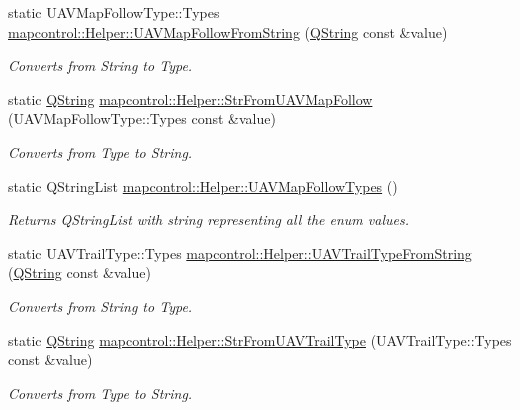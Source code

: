 \begin{DoxyCompactItemize}
static \-U\-A\-V\-Map\-Follow\-Type\-::\-Types \hyperlink{group___o_p_map_widget_ga7708397f9398bd6c207bd305ee711221}{mapcontrol\-::\-Helper\-::\-U\-A\-V\-Map\-Follow\-From\-String} (\hyperlink{group___u_a_v_objects_plugin_gab9d252f49c333c94a72f97ce3105a32d}{\-Q\-String} const \&value)
\begin{DoxyCompactList}\small\item\em \-Converts from \-String to \-Type. \end{DoxyCompactList}\item 
static \hyperlink{group___u_a_v_objects_plugin_gab9d252f49c333c94a72f97ce3105a32d}{\-Q\-String} \hyperlink{group___o_p_map_widget_ga94cca4ceda7e5cdea3ae019436aa0429}{mapcontrol\-::\-Helper\-::\-Str\-From\-U\-A\-V\-Map\-Follow} (\-U\-A\-V\-Map\-Follow\-Type\-::\-Types const \&value)
\begin{DoxyCompactList}\small\item\em \-Converts from \-Type to \-String. \end{DoxyCompactList}\item 
static \-Q\-String\-List \hyperlink{group___o_p_map_widget_gacb5ad4b31c187f1d10098f83053246ff}{mapcontrol\-::\-Helper\-::\-U\-A\-V\-Map\-Follow\-Types} ()
\begin{DoxyCompactList}\small\item\em \-Returns \-Q\-String\-List with string representing all the enum values. \end{DoxyCompactList}\item 
static \-U\-A\-V\-Trail\-Type\-::\-Types \hyperlink{group___o_p_map_widget_ga09a4876b008985c01beda818f860830b}{mapcontrol\-::\-Helper\-::\-U\-A\-V\-Trail\-Type\-From\-String} (\hyperlink{group___u_a_v_objects_plugin_gab9d252f49c333c94a72f97ce3105a32d}{\-Q\-String} const \&value)
\begin{DoxyCompactList}\small\item\em \-Converts from \-String to \-Type. \end{DoxyCompactList}\item 
static \hyperlink{group___u_a_v_objects_plugin_gab9d252f49c333c94a72f97ce3105a32d}{\-Q\-String} \hyperlink{group___o_p_map_widget_gab2895e09cf7115779c738cc43d815123}{mapcontrol\-::\-Helper\-::\-Str\-From\-U\-A\-V\-Trail\-Type} (\-U\-A\-V\-Trail\-Type\-::\-Types const \&value)
\begin{DoxyCompactList}\small\item\em \-Converts from \-Type to \-String. \end{DoxyCompactList}\item 

\end{DoxyCompactItemize}
